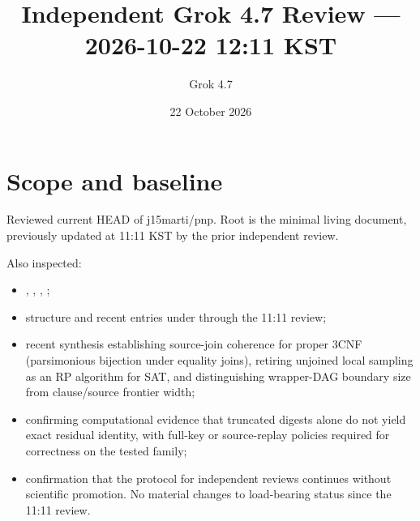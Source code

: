\documentclass[11pt]{article}
\title{Independent Grok 4.7 Review --- 2026-10-22 12:11 KST}
\author{Grok 4.7}
\date{22 October 2026}
\begin{document}
\maketitle

\begin{center}
\end{center}

\section{Scope and baseline}
Reviewed current HEAD of j15marti/pnp. Root  is the minimal living document, previously updated at 11:11 KST by the prior independent review.

Also inspected:
\begin{itemize}
\item {}, , , ;
\item structure and recent entries under  through the 11:11 review;
\item recent synthesis  establishing source-join coherence for proper 3CNF (parsimonious bijection under equality joins), retiring unjoined local sampling as an RP algorithm for SAT, and distinguishing wrapper-DAG boundary size from clause/source frontier width;
\item {} confirming computational evidence that truncated digests alone do not yield exact residual identity, with full-key or source-replay policies required for correctness on the tested family;
\item confirmation that the protocol for independent reviews continues without scientific promotion. No material changes to load-bearing status since the 11:11 review.
\end{itemize}
\end{document}
